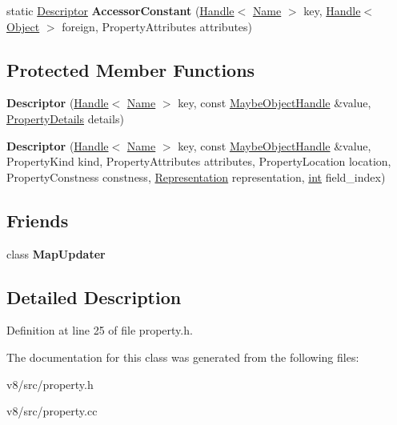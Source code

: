 \begin{DoxyCompactItemize}
\item 
\mbox{\label{classv8_1_1internal_1_1Descriptor_a4f9aaea44760059435ee01f633c562d6}} 
static \mbox{\hyperlink{classv8_1_1internal_1_1Descriptor}{Descriptor}} {\bfseries Accessor\+Constant} (\mbox{\hyperlink{classv8_1_1internal_1_1Handle}{Handle}}$<$ \mbox{\hyperlink{classv8_1_1internal_1_1Name}{Name}} $>$ key, \mbox{\hyperlink{classv8_1_1internal_1_1Handle}{Handle}}$<$ \mbox{\hyperlink{classv8_1_1internal_1_1Object}{Object}} $>$ foreign, Property\+Attributes attributes)
\end{DoxyCompactItemize}
\subsection*{Protected Member Functions}
\begin{DoxyCompactItemize}
\item 
\mbox{\label{classv8_1_1internal_1_1Descriptor_a0ab3708b28a7974347e9cd1c6f6d2200}} 
{\bfseries Descriptor} (\mbox{\hyperlink{classv8_1_1internal_1_1Handle}{Handle}}$<$ \mbox{\hyperlink{classv8_1_1internal_1_1Name}{Name}} $>$ key, const \mbox{\hyperlink{classv8_1_1internal_1_1MaybeObjectHandle}{Maybe\+Object\+Handle}} \&value, \mbox{\hyperlink{classv8_1_1internal_1_1PropertyDetails}{Property\+Details}} details)
\item 
\mbox{\label{classv8_1_1internal_1_1Descriptor_a22aa209e099d6cf8239e743ae25dbbc3}} 
{\bfseries Descriptor} (\mbox{\hyperlink{classv8_1_1internal_1_1Handle}{Handle}}$<$ \mbox{\hyperlink{classv8_1_1internal_1_1Name}{Name}} $>$ key, const \mbox{\hyperlink{classv8_1_1internal_1_1MaybeObjectHandle}{Maybe\+Object\+Handle}} \&value, Property\+Kind kind, Property\+Attributes attributes, Property\+Location location, Property\+Constness constness, \mbox{\hyperlink{classv8_1_1internal_1_1Representation}{Representation}} representation, \mbox{\hyperlink{classint}{int}} field\+\_\+index)
\end{DoxyCompactItemize}
\subsection*{Friends}
\begin{DoxyCompactItemize}
\item 
\mbox{\label{classv8_1_1internal_1_1Descriptor_a36006e16ddd285384c594cb01db0a9fb}} 
class {\bfseries Map\+Updater}
\end{DoxyCompactItemize}


\subsection{Detailed Description}


Definition at line 25 of file property.\+h.



The documentation for this class was generated from the following files\+:\begin{DoxyCompactItemize}
\item 
v8/src/property.\+h\item 
v8/src/property.\+cc\end{DoxyCompactItemize}
